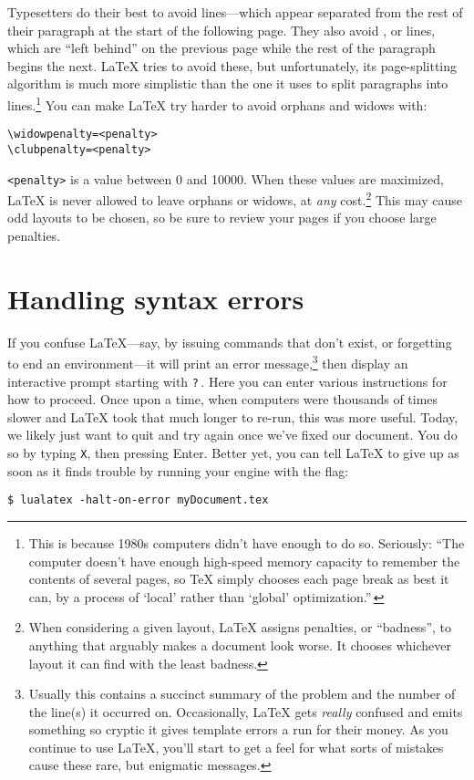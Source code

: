 Typesetters do their best to avoid  lines---which appear
separated from the rest of their paragraph at the start of the following
page.
They also avoid , or  lines,
which are ``left behind'' on the previous page while the rest of the paragraph
begins the next.
\LaTeX{} tries to avoid these, but unfortunately, its page-splitting algorithm
is much more simplistic than the one it uses
to split paragraphs into lines.\punckern\footnote{This is because
1980s computers didn't have enough  to do so. Seriously:
``The computer doesn't have enough high-speed memory capacity to remember the
contents of several pages,
so \TeX{} simply chooses each page break as best it can, by a process of
`local' rather than `global' optimization.\quotekern''\,}
You can make \LaTeX{} try harder to avoid orphans and widows with:
\begin{leftfigure}
\begin{lstlisting}
\widowpenalty=<penalty>
\clubpenalty=<penalty>
\end{lstlisting}
\end{leftfigure}
\verb|<penalty>| is a value between 0 and 10000.
When these values are maximized,
\LaTeX{} is never allowed to leave orphans or widows,
at \emph{any} cost.\punckern\footnote{When considering a given layout,
\LaTeX{} assigns penalties, or ``badness''\quotekern,
to anything that arguably makes a document look worse.
It chooses whichever layout it can find with the least badness.}
This may cause odd layouts to be chosen,
so be sure to review your pages if you choose large penalties.

\section{Handling syntax errors}
If you confuse \LaTeX{}---say, by issuing commands that don't exist,
or forgetting to end an environment---it will print an
error message,\punckern\footnote{Usually this contains a succinct summary of
the problem and the number of the line(s) it occurred on. Occasionally,
\LaTeX{} gets \emph{really} confused and emits something so cryptic it gives
\cpp{} template errors a run for their money.
As you continue to use \LaTeX, you'll start to get a feel for what sorts of
mistakes cause these rare, but enigmatic messages.}
then display an interactive prompt starting with \texttt{?}\,.
Here you can enter various instructions for how to proceed.
Once upon a time, when computers were thousands of times slower and
\LaTeX{} took that much longer to re-run, this was more useful.
Today, we likely just want to quit and try again once we've fixed our document.
You do so by typing \texttt{X}, then pressing Enter.
Better yet, you can tell \LaTeX{} to give up as soon as it finds trouble
by running your engine with the  flag:
\begin{leftfigure}
\begin{lstlisting}
$ lualatex -halt-on-error myDocument.tex
\end{lstlisting}
\end{leftfigure}
